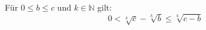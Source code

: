 Für $0 \leq b \leq c$ und $k \in \mathbb{N}$ gilt:
$$0 < \sqrt[k]{c} - \sqrt[k]{b} \leq \sqrt[k]{c-b}$$